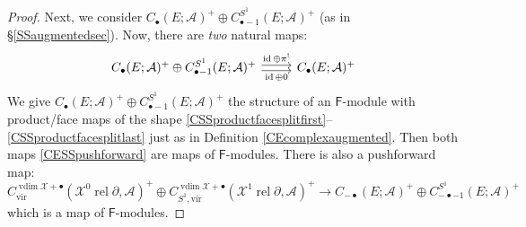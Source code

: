 \documentclass[12pt]{article}
\theoremstyle{definition}
\theoremstyle{remark}
\numberwithin{equation}{subsection}
\newcommand{\X}{\mathcal X}
\newcommand{\A}{\mathcal A}
\newcommand{\vdim}{\operatorname{vdim}}
\newcommand{\sF}{\mathsf{F}}
\newcommand{\vir}{\mathrm{vir}}
\newcommand{\id}{\operatorname{id}}
\newcommand{\rel}{\operatorname{rel}}
\begin{document}
\begin{proof}
Next, we consider $C_\bullet(E;\A)^+\oplus C_{\bullet-1}^{S^1}(E;\A)^+$ (as in \S\ref{SSaugmentedsec}).  Now, there are \emph{two} natural maps:
\begin{equation}\label{CESSpushforward}
\begin{tikzcd}
C_\bullet(E;\A)^+\oplus C_{\bullet-1}^{S^1}(E;\A)^+\ar[yshift=0.5ex]{r}{\id\oplus{\pi^!}}\ar[yshift=-0.5ex]{r}[swap]{\id\oplus 0}&C_\bullet(E;\A)^+
\end{tikzcd}
\end{equation}
We give $C_\bullet(E;\A)^+\oplus C_{\bullet-1}^{S^1}(E;\A)^+$ the structure of an $\sF$-module with product/face maps of the shape \eqref{CSSproductfacesplitfirst}--\eqref{CSSproductfacesplitlast} just as in Definition \ref{CEcomplexaugmented}.  Then both maps \eqref{CESSpushforward} are maps of $\sF$-modules.  There is also a pushforward map:
\begin{equation*}%
C^{\vdim\X+\bullet}_\vir(\X^0\rel\partial,\A)^+\oplus C^{\vdim\X+\bullet}_{S^1,\vir}(\X^1\rel\partial,\A)^+\to C_{-\bullet}(E;\A)^+\oplus C_{-\bullet-1}^{S^1}(E;\A)^+
\end{equation*}
which is a map of $\sF$-modules.


\end{proof}
\end{document}
